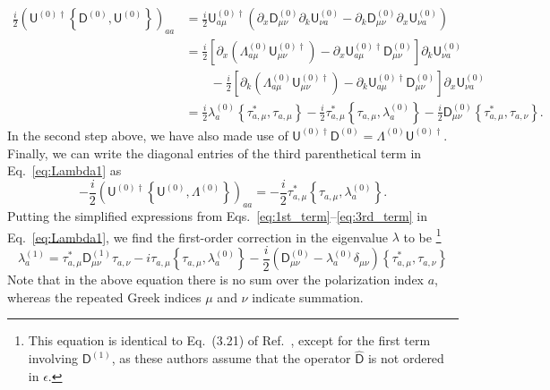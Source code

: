 \begin{equation}
  \begin{aligned}
    \frac{i}{2}\left(\mathsf{U}^{(0)\dagger}  \left\{\mathsf{D}^{(0)}, \mathsf{U}^{(0)}\right\}\right)_{aa} &= \frac{i}{2}\mathsf{U}^{(0)\dagger}_{a\mu}\left(\partial_{x}\mathsf{D}^{(0)}_{\mu\nu}\partial_{k}\mathsf{U}^{(0)}_{\nu a} - \partial_{k}\mathsf{D}^{(0)}_{\mu\nu}\partial_{x}\mathsf{U}_{\nu a}^{(0)}\right)\\
                                                                                                                  &=  \frac{i}{2}\left[\partial_{x}\left(\Lambda^{(0)}_{a\mu}\mathsf{U}^{(0)\dagger}_{\mu\nu}\right) - \partial_{x}\mathsf{U}^{(0)\dagger}_{a\mu}\mathsf{D}^{(0)}_{\mu\nu}\right]\partial_{k}\mathsf{U}_{\nu a}^{(0)}\\
                                                                                                                    &\phantom{}\qquad - \frac{i}{2}\left[\partial_{k}\left(\Lambda^{(0)}_{a\mu}\mathsf{U}^{(0)\dagger}_{\mu\nu}\right) - \partial_{k}\mathsf{U}^{(0)\dagger}_{a\mu}\mathsf{D}^{(0)}_{\mu\nu}\right]\partial_{x}\mathsf{U}_{\nu a}^{(0)}\\
                                                                                                                      &= \frac{i}{2}\lambda^{(0)}_{a}\left\{\tau_{a,\mu}^{*}, \tau_{a,\mu}\right\} - \frac{i}{2}\tau_{a,\mu}^{*}\left\{\tau_{a,\mu},\lambda^{(0)}_{a}\right\} - \frac{i}{2}\mathsf{D}^{(0)}_{\mu\nu}\left\{\tau_{a,\mu}^{*}, \tau_{a,\nu}\right\}.
  \end{aligned}
  \label{eq:2nd_term}
\end{equation}
%
In the second step above, we have also made use of $\mathsf{U}^{(0)\dagger}\mathsf{D}^{(0)} = \Lambda^{(0)}\mathsf{U}^{(0)\dagger}$.
Finally, we can write the diagonal entries of the third parenthetical term in Eq.~\eqref{eq:Lambda1} as
%
\begin{equation}
  -\frac{i}{2}\left(\mathsf{U}^{(0)\dagger}\left\{\mathsf{U}^{(0)}, \Lambda^{(0)}\right\}\right)_{aa} = -\frac{i}{2}\tau_{a,\mu}^{*}\left\{\tau_{a,\mu},\lambda_{a}^{(0)}\right\}.
  \label{eq:3rd_term}
\end{equation}
%
Putting the simplified expressions from Eqs.~\eqref{eq:1st_term}--\eqref{eq:3rd_term} in Eq.~\eqref{eq:Lambda1}, we find the first-order correction in the eigenvalue $\lambda$ to be%
\footnote{This equation is identical to Eq.~(3.21) of Ref.~\cite{littlejohn1991a}, except for the first term involving $\mathsf{D}^{(1)}$, as these authors assume that the operator $\hat{\mathsf{D}}$ is not ordered in $\epsilon$.}
%
\begin{equation}
  \boxed{
  \lambda^{(1)}_{a} = \tau_{a,\mu}^{*}\mathsf{D}_{\mu\nu}^{(1)}\tau_{a,\nu} - i\tau_{a,\mu}\left\{\tau_{a,\mu}, \lambda^{(0)}_{a}\right\} - \frac{i}{2}\left(\mathsf{D}^{(0)}_{\mu\nu} - \lambda^{(0)}_{a}\delta_{\mu\nu}\right)\left\{\tau_{a,\mu}^{*}, \tau_{a,\nu}\right\}}
  \label{eq:lambda1}
\end{equation}
%
Note that in the above equation there is no sum over the polarization index $a$, whereas the repeated Greek indices $\mu$ and $\nu$ indicate summation.


